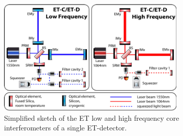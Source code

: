 \begin{figure}[thbp]
\centering
\includegraphics[width=0.8\textwidth]{Detector/Optics/OpticalLayout/OpticalLayoutFigures/Layout_overview.pdf}
\caption{Simplified sketch of the ET low and high frequency core interferometers of a single ET-detector.}
\label{Fig:opt_lay_over}
\end{figure}


